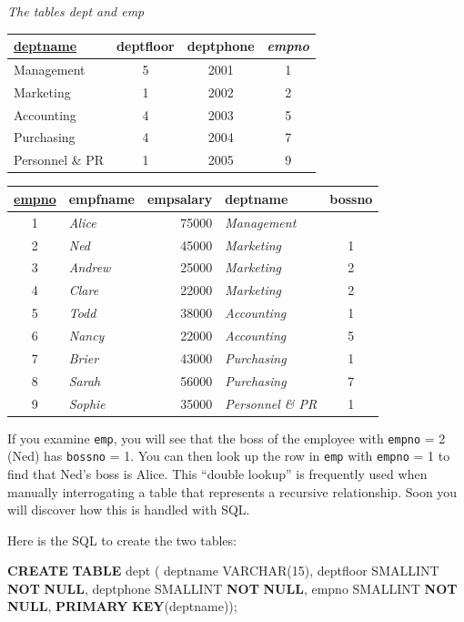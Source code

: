 \documentclass[
]{article}
\newenvironment{Shaded}{\begin{snugshade}}{\end{snugshade}}
\newcommand{\DataTypeTok}[1]{\textcolor[rgb]{0.13,0.29,0.53}{#1}}
\newcommand{\DecValTok}[1]{\textcolor[rgb]{0.00,0.00,0.81}{#1}}
\newcommand{\KeywordTok}[1]{\textcolor[rgb]{0.13,0.29,0.53}{\textbf{#1}}}
\newcommand{\NormalTok}[1]{#1}
\begin{document}
\emph{The tables dept and emp}

\begin{longtable}[]{@{}lccc@{}}
\toprule
\underline{deptname} & deptfloor & deptphone & \emph{empno} \\
\midrule
\endhead
Management & 5 & 2001 & 1 \\
Marketing & 1 & 2002 & 2 \\
Accounting & 4 & 2003 & 5 \\
Purchasing & 4 & 2004 & 7 \\
Personnel \& PR & 1 & 2005 & 9 \\
\bottomrule
\end{longtable}

\begin{longtable}[]{@{}clrlc@{}}
\toprule
\underline{empno} & empfname & empsalary & deptname & bossno \\
\midrule
\endhead
1 & \emph{Alice} & 75000 & \emph{Management} & \\
2 & \emph{Ned} & 45000 & \emph{Marketing} & 1 \\
3 & \emph{Andrew} & 25000 & \emph{Marketing} & 2 \\
4 & \emph{Clare} & 22000 & \emph{Marketing} & 2 \\
5 & \emph{Todd} & 38000 & \emph{Accounting} & 1 \\
6 & \emph{Nancy} & 22000 & \emph{Accounting} & 5 \\
7 & \emph{Brier} & 43000 & \emph{Purchasing} & 1 \\
8 & \emph{Sarah} & 56000 & \emph{Purchasing} & 7 \\
9 & \emph{Sophie} & 35000 & \emph{Personnel \& PR} & 1 \\
\bottomrule
\end{longtable}

If you examine \texttt{emp}, you will see that the boss of the employee with
\texttt{empno} = 2 (Ned) has \texttt{bossno} = 1. You can then look up the row in
\texttt{emp} with \texttt{empno} = 1 to find that Ned's boss is Alice. This ``double
lookup'' is frequently used when manually interrogating a table that
represents a recursive relationship. Soon you will discover how this is
handled with SQL.

Here is the SQL to create the two tables:

\begin{Shaded}
\begin{Highlighting}[]
\KeywordTok{CREATE} \KeywordTok{TABLE}\NormalTok{ dept (}
\NormalTok{    deptname        }\DataTypeTok{VARCHAR}\NormalTok{(}\DecValTok{15}\NormalTok{),}
\NormalTok{    deptfloor       }\DataTypeTok{SMALLINT} \KeywordTok{NOT} \KeywordTok{NULL}\NormalTok{,}
\NormalTok{    deptphone       }\DataTypeTok{SMALLINT} \KeywordTok{NOT} \KeywordTok{NULL}\NormalTok{,}
\NormalTok{    empno           }\DataTypeTok{SMALLINT} \KeywordTok{NOT} \KeywordTok{NULL}\NormalTok{,}
    \KeywordTok{PRIMARY} \KeywordTok{KEY}\NormalTok{(deptname));}
\end{Highlighting}
\end{Shaded}
\end{document}
